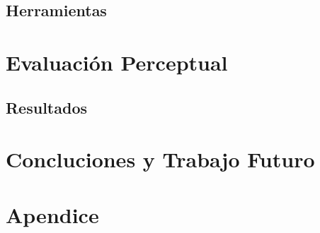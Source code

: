 \documentclass[11pt,a4paper,twoside]{tesis}
\begin{document}
\section{Herramientas}

\pagebreak
\chapter{Evaluación Perceptual}

\pagebreak

\section{Resultados}

\pagebreak

\chapter{Concluciones y Trabajo Futuro}

\pagebreak
\chapter{Apendice}


\backmatter
%
\end{document}
